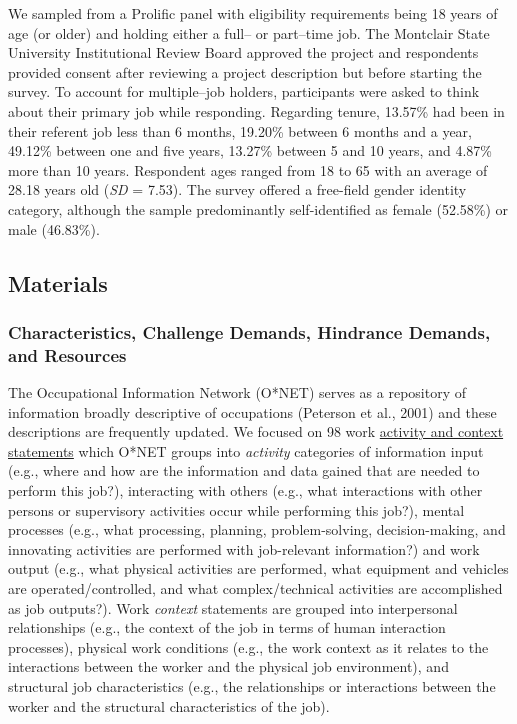 \documentclass[
  man]{apa7}
\begin{document}
We sampled from a Prolific panel with eligibility requirements being 18 years of age (or older) and holding either a full-- or part--time job. The Montclair State University Institutional Review Board approved the project and respondents provided consent after reviewing a project description but before starting the survey. To account for multiple--job holders, participants were asked to think about their primary job while responding. Regarding tenure, 13.57\% had been in their referent job less than 6 months, 19.20\% between 6 months and a year, 49.12\% between one and five years, 13.27\% between 5 and 10 years, and 4.87\% more than 10 years. Respondent ages ranged from 18 to 65 with an average of 28.18 years old (\emph{SD} = 7.53). The survey offered a free-field gender identity category, although the sample predominantly self-identified as female (52.58\%) or male (46.83\%).

\subsection{Materials}\label{materials}

\subsubsection{Characteristics, Challenge Demands, Hindrance Demands, and Resources}\label{characteristics-challenge-demands-hindrance-demands-and-resources}

The Occupational Information Network (O*NET) serves as a repository of information broadly descriptive of occupations (Peterson et al., 2001) and these descriptions are frequently updated. We focused on 98 work \href{https://www.ONETonline.org/find/descriptor/result/4.A.1.b.3}{activity and context statements} which O*NET groups into \emph{activity} categories of information input (e.g., where and how are the information and data gained that are needed to perform this job?), interacting with others (e.g., what interactions with other persons or supervisory activities occur while performing this job?), mental processes (e.g., what processing, planning, problem-solving, decision-making, and innovating activities are performed with job-relevant information?) and work output (e.g., what physical activities are performed, what equipment and vehicles are operated/controlled, and what complex/technical activities are accomplished as job outputs?). Work \emph{context} statements are grouped into interpersonal relationships (e.g., the context of the job in terms of human interaction processes), physical work conditions (e.g., the work context as it relates to the interactions between the worker and the physical job environment), and structural job characteristics (e.g., the relationships or interactions between the worker and the structural characteristics of the job).
\end{document}
